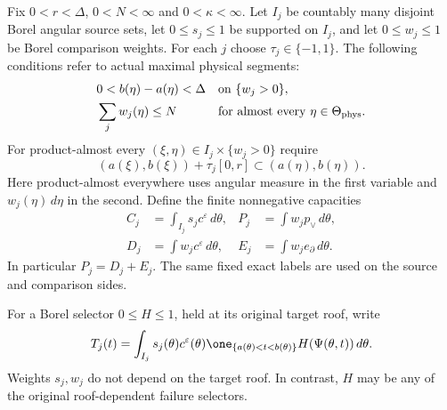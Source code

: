 \begin{definition}\label{def:v107-family}
Fix $0<r<\Delta$, $0<N<\infty$ and $0<\kappa<\infty$.
Let $I_j$ be countably many disjoint Borel angular source sets,
let $0\le s_j\le1$ be supported on $I_j$, and let $0\le w_j\le1$
be Borel comparison weights. For each $j$ choose $\tau_j\in\{-1,1\}$.
The following conditions refer to actual maximal physical segments:
\begin{align}
 &0<b(\eta)-a(\eta)<\Delta
                   &&\text{on }\{w_j>0\},\label{eq:v107-length}\\
 &\sum_j w_j(\eta)\le N
                   &&\text{for almost every }\eta\in\Theta_{\rm phys}.
                                      \label{eq:v107-overlap}
\end{align}
For product-almost every $(\xi,\eta)\in I_j\times\{w_j>0\}$ require
\begin{equation}\label{eq:v107-inclusion}
 (a(\xi),b(\xi))+\tau_j[0,r]\subset(a(\eta),b(\eta)).
\end{equation}
Here product-almost everywhere uses angular measure in the first
variable and $w_j(\eta)\,d\eta$ in the second. Define the finite
nonnegative capacities
\begin{equation}\label{eq:v107-capacities}
 \begin{aligned}
 C_j&=\int_{I_j}s_jc^\varepsilon\,d\theta,&
 P_j&=\int w_jp_\vee\,d\theta,\\
 D_j&=\int w_jc^\varepsilon\,d\theta,&
 E_j&=\int w_je_\partial\,d\theta.
 \end{aligned}
\end{equation}
In particular $P_j=D_j+E_j$. The same fixed exact labels are used
on the source and comparison sides.
\end{definition}

For a Borel selector $0\le H\le1$, held at its original target roof,
write
\[
 T_j(t)=\int_{I_j}s_j(\theta)c^\varepsilon(\theta)
       \one_{\{a(\theta)<t<b(\theta)\}}H(\Psi(\theta,t))\,d\theta.
\]
Weights $s_j,w_j$ do not depend on the target roof. In contrast,
$H$ may be any of the original roof-dependent failure selectors.

